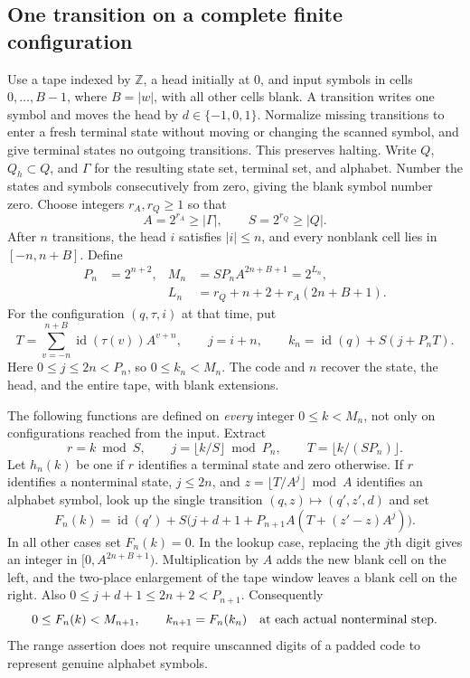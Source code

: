 \subsection{One transition on a complete finite configuration}
Use a tape indexed by $\mathbb Z$, a head initially at $0$, and input symbols
in cells $0,\ldots,B-1$, where $B=|w|$, with all other cells blank.
A transition writes one symbol and
moves the head by $d\in\{-1,0,1\}$.  Normalize missing transitions to enter
a fresh terminal state without moving or changing the scanned symbol,
and give terminal states no outgoing transitions.  This preserves halting.
Write $Q$, $Q_h\subset Q$, and $\Gamma$ for the resulting state set, terminal
set, and alphabet.  Number the states and symbols consecutively from
zero, giving the blank symbol number zero.  Choose integers $r_A,r_Q\geq1$
so that
\[
 A=2^{r_A}\geq|\Gamma|,\qquad S=2^{r_Q}\geq|Q|.
\]
After $n$ transitions, the head $i$ satisfies $|i|\leq n$, and every
nonblank cell lies in $[-n,n+B]$.  Define
\begin{align}
 P_n&=2^{n+2},&
 M_n&=S P_n A^{2n+B+1}=2^{L_n},\\
 &&
 L_n&=r_Q+n+2+r_A(2n+B+1). \label{eq:rapid-capacity}
\end{align}
For the configuration $(q,\tau,i)$ at that time, put
\begin{equation}
 T=\sum_{v=-n}^{n+B}\operatorname{id}(\tau(v))A^{v+n},\qquad
 j=i+n,\qquad
 k_n=\operatorname{id}(q)+S(j+P_nT).
 \label{eq:rapid-code}
\end{equation}
Here $0\leq j\leq2n<P_n$, so $0\leq k_n<M_n$.  The code and $n$ recover
the state, the head, and the entire tape, with blank extensions.

The following functions are defined on \emph{every} integer
$0\leq k<M_n$, not only on configurations reached from the input.  Extract
\[
 r=k\bmod S,\qquad
 j=\lfloor k/S\rfloor\bmod P_n,\qquad
 T=\lfloor k/(SP_n)\rfloor.
\]
Let $h_n(k)$ be one if $r$ identifies a terminal state and zero otherwise.
If $r$ identifies a nonterminal state, $j\leq2n$, and
$z=\lfloor T/A^j\rfloor\bmod A$ identifies an alphabet symbol, look up the
single transition $(q,z)\mapsto(q',z',d)$ and set
\begin{equation}
 F_n(k)=\operatorname{id}(q')+
 S\bigl(j+d+1+P_{n+1}A(T+(z'-z)A^j)\bigr).
 \label{eq:rapid-transition}
\end{equation}
In all other cases set $F_n(k)=0$.  In the lookup case, replacing the
$j$th digit gives an integer in $[0,A^{2n+B+1})$.  Multiplication by $A$
adds the new blank cell on the left, and the two-place enlargement of the
tape window leaves a blank cell on the right.  Also
$0\leq j+d+1\leq2n+2<P_{n+1}$.  Consequently
\begin{equation}
 0\leq F_n(k)<M_{n+1},
 \qquad k_{n+1}=F_n(k_n)
 \quad\hbox{at each actual nonterminal step}.
 \label{eq:rapid-transition-range}
\end{equation}
The range assertion does not require unscanned digits of a padded code
to represent genuine alphabet symbols.

